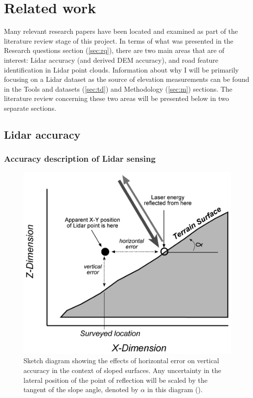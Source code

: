 
\section{Related work}
\label{sec:rw}

Many relevant research papers have been located and examined as part of the literature review stage of this project. In terms of what was presented in the Research questions section (\ref{sec:rq}), there are two main areas that are of interest: Lidar accuracy (and derived DEM accuracy), and road feature identification in Lidar point clouds. Information about why I will be primarily focusing on a Lidar dataset as the source of elevation measurements can be found in the Tools and datasets (\ref{sec:td}) and Methodology (\ref{sec:m}) sections. The literature review concerning these two areas will be presented below in two separate sections.

\subsection{Lidar accuracy}
\label{sub:lidaraccuracy}
\subsubsection*{Accuracy description of Lidar sensing}

\begin{figure}
    \includegraphics[width=0.95\linewidth]{p2/figs/hodgson_breshanan_2004_01.png} 
    \caption{Sketch diagram showing the effects of horizontal error on vertical accuracy in the context of sloped surfaces. Any uncertainty in the lateral position of the point of reflection will be scaled by the tangent of the slope angle, denoted by $\alpha$ in this diagram (\cite{hodgson_breshanan_2004}).}
    \label{fig:elevationaccuracy}
\end{figure}

